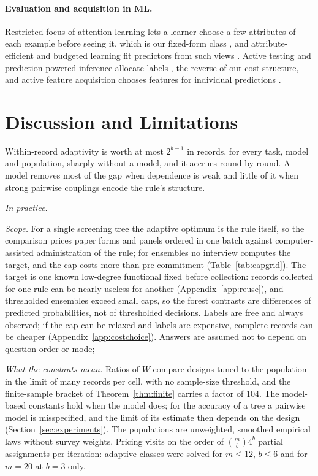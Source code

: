 \documentclass{article}
\begin{document}
\paragraph{Evaluation and acquisition in ML.} Restricted-focus-of-attention learning lets a learner choose a few attributes of each example before seeing it, which is our fixed-form class \citep{bendavid1998}, and attribute-efficient and budgeted learning fit predictors from such views \citep{cesa2011,hazan2012,lizotte2003,kapoor2005}. Active testing and prediction-powered inference allocate labels \citep{kossen2021,zrnic2024,angelopoulos2023}, the reverse of our cost structure, and active feature acquisition chooses features for individual predictions \citep{trapeznikov2013,nan2017,covert2023,vonkleist2025}.

\section{Discussion and Limitations}\label{sec:discussion}
Within-record adaptivity is worth at most $2^{b-1}$ in records, for every task, model and population, sharply without a model, and it accrues round by round. A model removes most of the gap when dependence is weak and little of it when strong pairwise couplings encode the rule's structure. \nDiscussionSentence

\emph{In practice.} \nPracticeSentence

\emph{Scope.} For a single screening tree the adaptive optimum is the rule itself, so the comparison prices paper forms and panels ordered in one batch against computer-assisted administration of the rule; for ensembles no interview computes the target, and the cap costs more than pre-commitment (Table~\ref{tab:capgrid}). The target is one known low-degree functional fixed before collection: records collected for one rule can be nearly useless for another (Appendix~\ref{app:reuse}), and thresholded ensembles exceed small caps, so the forest contrasts are differences of predicted probabilities, not of thresholded decisions. Labels are free and always observed; if the cap can be relaxed and labels are expensive, complete records can be cheaper (Appendix~\ref{app:costchoice}). Answers are assumed not to depend on question order or mode; \nOrderSentence{}

\emph{What the constants mean.} Ratios of $W$ compare designs tuned to the population in the limit of many records per cell, with no sample-size threshold, and the finite-sample bracket of Theorem~\ref{thm:finite} carries a factor of 104. The model-based constants hold when the model does; for the accuracy of a tree a pairwise model is misspecified, and the limit of its estimate then depends on the design (Section~\ref{sec:experiments}). The populations are unweighted, smoothed empirical laws without survey weights. Pricing visits on the order of $\binom mb4^b$ partial assignments per iteration: adaptive classes were solved for $m\le12$, $b\le6$ and for $m=20$ at $b=3$ only.
\end{document}
